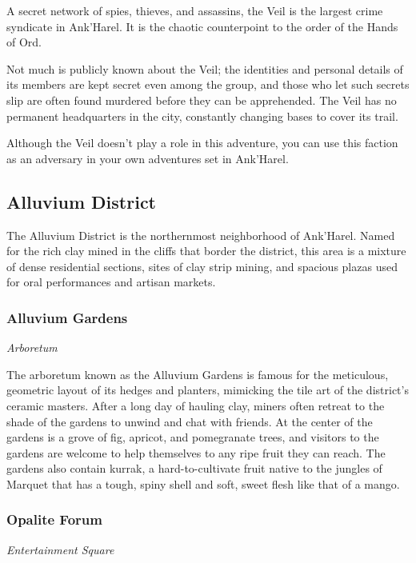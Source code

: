 \documentclass[a4paper, 11pt, bg=full, twocolumn, nooutline]{dndbook}
\begin{document}
A secret network of spies, thieves, and assassins, the Veil is the largest crime syndicate in Ank'Harel. It is the chaotic counterpoint to the order of the Hands of Ord.

Not much is publicly known about the Veil; the identities and personal details of its members are kept secret even among the group, and those who let such secrets slip are often found murdered before they can be apprehended. The Veil has no permanent headquarters in the city, constantly changing bases to cover its trail.

Although the Veil doesn't play a role in this adventure, you can use this faction as an adversary in your own adventures set in Ank'Harel.

\subsection{Alluvium District}

The Alluvium District is the northernmost neighborhood of Ank'Harel. Named for the rich clay mined in the cliffs that border the district, this area is a mixture of dense residential sections, sites of clay strip mining, and spacious plazas used for oral performances and artisan markets.


\subsubsection{Alluvium Gardens}

\textit{Arboretum}

The arboretum known as the Alluvium Gardens is famous for the meticulous, geometric layout of its hedges and planters, mimicking the tile art of the district's ceramic masters. After a long day of hauling clay, miners often retreat to the shade of the gardens to unwind and chat with friends. At the center of the gardens is a grove of fig, apricot, and pomegranate trees, and visitors to the gardens are welcome to help themselves to any ripe fruit they can reach. The gardens also contain kurrak, a hard-to-cultivate fruit native to the jungles of Marquet that has a tough, spiny shell and soft, sweet flesh like that of a mango.

\subsubsection{Opalite Forum}

\textit{Entertainment Square}
\end{document}
